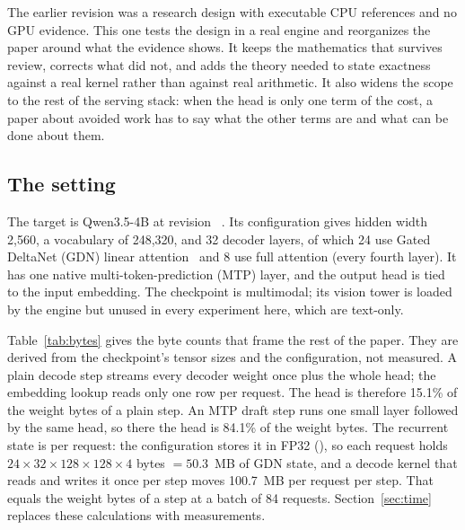 The earlier revision was a research design with executable CPU references and no GPU evidence. This one tests the design in a real engine and reorganizes the paper around what the evidence shows. It keeps the mathematics that survives review, corrects what did not, and adds the theory needed to state exactness against a real kernel rather than against real arithmetic. It also widens the scope to the rest of the serving stack: when the head is only one term of the cost, a paper about avoided work has to say what the other terms are and what can be done about them.

\subsection{The setting}\label{sec:setting}
The target is Qwen3.5-4B at revision \modelpin~\cite{qwenconfig,qwencard}. Its configuration gives hidden width 2,560, a vocabulary of 248,320, and 32 decoder layers, of which 24 use Gated DeltaNet (GDN) linear attention~\cite{gdn} and 8 use full attention (every fourth layer). It has one native multi-token-prediction (MTP) layer, and the output head is tied to the input embedding. The checkpoint is multimodal; its vision tower is loaded by the engine but unused in every experiment here, which are text-only.

Table~\ref{tab:bytes} gives the byte counts that frame the rest of the paper. They are derived from the checkpoint's tensor sizes and the configuration, not measured. A plain decode step streams every decoder weight once plus the whole head; the embedding lookup reads only one row per request. The head is therefore 15.1\% of the weight bytes of a plain step. An MTP draft step runs one small layer followed by the same head, so there the head is 84.1\% of the weight bytes. The recurrent state is per request: the configuration stores it in FP32 (), so each request holds $24\times32\times128\times128\times4$ bytes $=50.3$~MB of GDN state, and a decode kernel that reads and writes it once per step moves 100.7~MB per request per step. That equals the weight bytes of a step at a batch of 84 requests. Section~\ref{sec:time} replaces these calculations with measurements.

